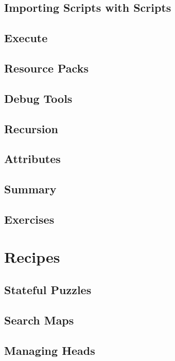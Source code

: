 \documentclass[oneside]{book}
\begin{document}
\section{Importing Scripts with Scripts}
\blindtext

\section{Execute}
\blindtext

\section{Resource Packs}
\blindtext

\section{Debug Tools}
\blindtext

\section{Recursion}
\blindtext

\section{Attributes}
\blindtext

\section{Summary}
\blindtext

\section{Exercises}
\blindtext

\chapter{Recipes}

\section{Stateful Puzzles}
\blindtext

\section{Search Maps}
\blindtext

\section{Managing Heads}
\blindtext
\end{document}
